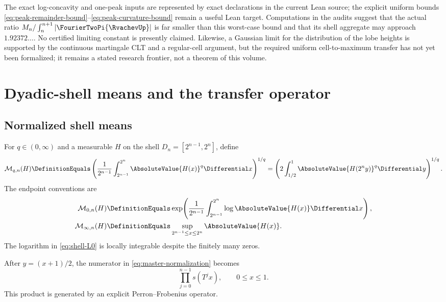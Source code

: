 \documentclass[11pt,oneside]{article}
\numberwithin{equation}{section}
\theoremstyle{definition}
\theoremstyle{remark}
\begin{document}
The exact log-concavity and one-peak inputs are represented by exact declarations in the current Lean source; the explicit uniform bounds
\eqref{eq:peak-remainder-bound}--\eqref{eq:peak-curvature-bound} remain a useful Lean target.
Computations in the audits suggest that the actual ratio
$M_n/\int_n^{n+1}|\FourierTwoPi{\RvachevUp}|$ is far smaller than this worst-case bound and that its shell
aggregate may approach $1.92372\ldots$.  No certified limiting constant is presently
claimed.  Likewise, a Gaussian limit for the distribution of the lobe heights is supported
by the continuous martingale CLT and a regular-cell argument, but the required uniform
cell-to-maximum transfer has not yet been formalized; it remains a stated research frontier,
not a theorem of this volume.

\section{Dyadic-shell means and the transfer operator}
\label{sec:Lq-spectrum}

\subsection{Normalized shell means}

For $q\in(0,\infty)$ and a measurable $H$ on the shell
$D_n=[2^{n-1},2^n]$, define
\begin{equation}
 \mathcal M_{q,n}(H)
 \DefinitionEquals\left(\frac1{2^{n-1}}\int_{2^{n-1}}^{2^n}\AbsoluteValue{H(x)}^q\Differential x\right)^{1/q}
 =\left(2\int_{1/2}^{1}\AbsoluteValue{H(2^ny)}^q\Differential y\right)^{1/q}.
 \label{eq:shell-Lq}
\end{equation}
The endpoint conventions are
\begin{align}
 \mathcal M_{0,n}(H)
 &\DefinitionEquals\exp\!\left(\frac1{2^{n-1}}
       \int_{2^{n-1}}^{2^n}\log\AbsoluteValue{H(x)}\Differential x\right),
 \label{eq:shell-L0}\\
 \mathcal M_{\infty,n}(H)
 &\DefinitionEquals\sup_{2^{n-1}\le x\le2^n}\AbsoluteValue{H(x)}.
 \label{eq:shell-Linf}
\end{align}
The logarithm in \eqref{eq:shell-L0} is locally integrable despite the finitely many zeros.

After $y=(x+1)/2$, the numerator in \eqref{eq:master-normalization} becomes
\begin{equation}
 \prod_{j=0}^{n-1}s(T^jx),
 \qquad 0\le x\le1.
 \label{eq:forward-product}
\end{equation}
This product is generated by an explicit Perron--Frobenius operator.
\end{document}
